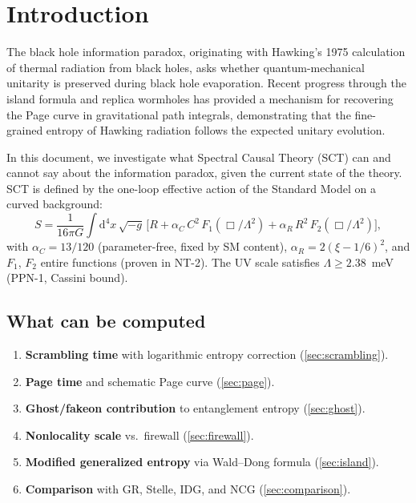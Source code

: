 \documentclass[11pt,a4paper]{article}
\renewcommand{\dd}{\mathrm{d}}
\theoremstyle{plain}
\theoremstyle{definition}
\begin{document}
\section{Introduction}
\label{sec:intro}

The black hole information paradox, originating with Hawking's 1975
calculation of thermal radiation from black holes, asks whether
quantum-mechanical unitarity is preserved during black hole
evaporation.  Recent progress through the island formula
\cite{Penington2019,AEMM2019} and replica wormholes
\cite{AHMST2019} has provided a mechanism for recovering the
Page curve in gravitational path integrals, demonstrating that
the fine-grained entropy of Hawking radiation follows the expected
unitary evolution.

In this document, we investigate what Spectral Causal Theory (SCT)
can and cannot say about the information paradox, given the current
state of the theory.  SCT is defined by the one-loop effective
action of the Standard Model on a curved background:
\begin{equation}
\label{eq:sct-action}
S = \frac{1}{16\pi G}\int\dd^4x\,\sqrt{-g}\,
  \bigl[R + \alpha_C\,C^2\,F_1(\Box/\Lambda^2)
        + \alpha_R\,R^2\,F_2(\Box/\Lambda^2)\bigr],
\end{equation}
with $\alpha_C = 13/120$ (parameter-free, fixed by SM content),
$\alpha_R = 2(\xi - 1/6)^2$, and $F_1$, $F_2$ entire functions
(proven in NT-2).  The UV scale satisfies $\Lambda \geq 2.38$~meV
(PPN-1, Cassini bound).

\subsection{What can be computed}

\begin{enumerate}
\item \textbf{Scrambling time} with logarithmic entropy correction
      (\cref{sec:scrambling}).
\item \textbf{Page time} and schematic Page curve (\cref{sec:page}).
\item \textbf{Ghost/fakeon contribution} to entanglement entropy
      (\cref{sec:ghost}).
\item \textbf{Nonlocality scale} vs.\ firewall (\cref{sec:firewall}).
\item \textbf{Modified generalized entropy} via Wald--Dong formula
      (\cref{sec:island}).
\item \textbf{Comparison} with GR, Stelle, IDG, and NCG
      (\cref{sec:comparison}).
\end{enumerate}
\end{document}
